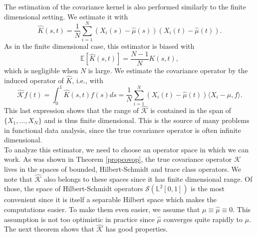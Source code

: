 \documentclass[10pt, a4paper]{report}
\newcommand{\E}[0]{\mathbb{E}}
\newcommand{\Ll}[0]{\mathbb{L}}
\newcommand{\K}[0]{\mathcal{K}}
\theoremstyle{definition}
\theoremstyle{remark}
\begin{document}
The estimation of the covariance kernel is also performed similarly to the finite dimensional setting. We estimate it with 
$$\hat{K}(s,t) = \frac{1}{N}\sum_{i=1}^{N}(X_i(s)-\hat{\mu}(s))(X_i(t)-\hat{\mu}(t)).$$
As in the finite dimensional case, this estimator is biased with 
$$\E[\hat{K}(s,t)] = \frac{N-1}{N}K(s,t),$$
which is negligible when $N$ is large. We estimate the covariance operator by the induced operator of $\hat{K}$, i.e., with
$$\hat{\K} f(t) = \int_{0}^{1} \hat{K}(s,t)f(s)ds = \frac{1}{N}\sum_{i=1}^{N}(X_i(t)-\hat{\mu}(t))\langle X_i-\hat{\mu}, f \rangle.$$
This last expression shows that the range of $\hat{\K}$ is contained in the span of $\{X_1,...,X_N\}$ and is thus finite dimensional. This is the source of many problems in functional data analysis, since the true covariance operator is often infinite dimensional.\\
To analyze this estimator, we need to choose an operator space in which we can work. As was shown in Theorem \ref{propcovop}, the true covariance operator $\K$ lives in the spaces of bounded, Hilbert-Schmidt and trace class operators. We note that $\hat{\K}$ also belongs to these spaces since it has finite dimensional range. Of those, the space of Hilbert-Schmidt operators $\mathcal{S}(\Ll^2[0,1])$ is the most convenient since it is itself a separable Hilbert space which makes the computations easier. To make them even easier, we assume that $\mu \equiv \hat{\mu} \equiv 0$. This assumption is not too optimistic in practice since $\hat{\mu}$ converges quite rapidly to $\mu$. The next theorem shows that $\hat{\K}$ has good properties.
\end{document}
